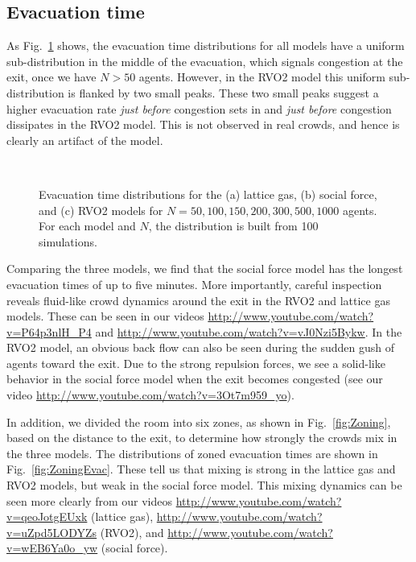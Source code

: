 \subsection{Evacuation time}
\label{EvacTime}

As Fig.~\ref{fig:EvacTime} shows, the evacuation time distributions for all models have a uniform sub-distribution in the middle of the evacuation, which signals congestion at the exit, once we have $N > 50$ agents. However, in the RVO2 model this uniform sub-distribution is flanked by two small peaks. These two small peaks suggest a higher evacuation rate \emph{just before} congestion sets in and \emph{just before} congestion dissipates in the RVO2 model. This is not observed in real crowds, and hence is clearly an artifact of the model.

\begin{figure}[htbp]
\centering
{}
\hspace{1cm}
\\
\caption{Evacuation time distributions for the (a) lattice gas, (b) social force, and (c) RVO2 models for $N = 50, 100, 150, 200, 300, 500, 1000$ agents. For each model and $N$, the distribution is built from 100 simulations.}
\label{fig:EvacTime}
\end{figure}

Comparing the three models, we find that the social force model has the longest evacuation times of up to five minutes. More importantly, careful inspection reveals fluid-like crowd dynamics around the exit in the RVO2 and lattice gas models. These can be seen in our  videos \url{http://www.youtube.com/watch?v=P64p3nlH_P4} and  \url{http://www.youtube.com/watch?v=vJ0Nzi5Bykw}. In the RVO2 model, an obvious back flow can also be seen during the sudden gush of agents toward the exit. Due to the strong repulsion forces, we see a solid-like behavior in the social force model when the exit becomes congested (see our video \url{http://www.youtube.com/watch?v=3Ot7m959_yo}).

In addition, we divided the room into six zones, as shown in Fig.~\ref{fig:Zoning}, based on the distance to the exit, to determine how strongly the crowds mix in the three models. The distributions of zoned evacuation times are shown in Fig.~\ref{fig:ZoningEvac}. These tell us that mixing is strong in the lattice gas and RVO2 models, but weak in the social force model. This mixing dynamics can be seen more clearly from our videos \url{http://www.youtube.com/watch?v=qeoJotgEUxk} (lattice gas), \url{http://www.youtube.com/watch?v=uZpd5LODYZs} (RVO2), and \url{http://www.youtube.com/watch?v=wEB6Ya0o_yw} (social force).

